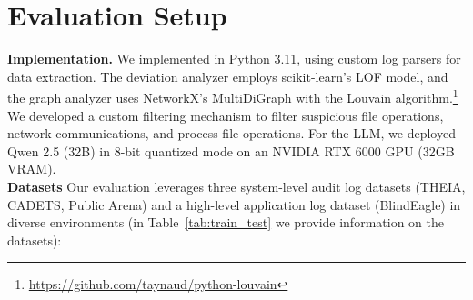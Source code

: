 \section{Evaluation Setup}

\noindent\textbf{Implementation.} We implemented \method in Python 3.11, using custom log parsers for data extraction. The deviation analyzer employs scikit-learn's LOF model, and the graph analyzer uses NetworkX's\cite{networkx} MultiDiGraph with the Louvain algorithm.\footnote{\url{https://github.com/taynaud/python-louvain}}
We developed a custom filtering mechanism to filter suspicious file operations, network communications, and process-file operations. For the LLM, we deployed Qwen 2.5 (32B) in 8-bit quantized mode on an NVIDIA RTX 6000 GPU (32GB VRAM). \\

\noindent\textbf{Datasets}
Our evaluation leverages three system-level audit log datasets (THEIA, CADETS, Public Arena) and a high-level application log dataset (BlindEagle) in diverse environments (in Table~\ref{tab:train_test} we provide information on the datasets): 

